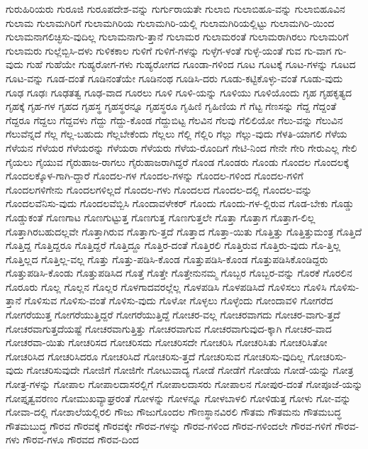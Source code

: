 {ಗುರುಹಿರಿಯರು
ಗುರೂಜಿ
ಗುರೂಪದೇಶ-ವನ್ನು
ಗುರ್ಗುರಾಯತೇ
ಗುಲಾಬಿ
ಗುಲಾಬಿಹೂ-ವನ್ನು
ಗುಲಾಬಿಹೂವಿನ
ಗುಲಾಮ
ಗುಲಾಮಗಿರಿಗೆ
ಗುಲಾಮಗಿರಿಯ
ಗುಲಾಮಗಿರಿ-ಯಲ್ಲಿ
ಗುಲಾಮಗಿರಿಯಲ್ಲಿಟ್ಟು
ಗುಲಾಮಗಿರಿ-ಯಿಂದ
ಗುಲಾಮನಾಗಲಿಚ್ಛಿಸು-ವುದಿಲ್ಲ
ಗುಲಾಮನಾಗು-ತ್ತಾನೆ
ಗುಲಾಮರ
ಗುಲಾಮರಂತೆ
ಗುಲಾಮರಾಗಿರಲು
ಗುಲಾಮರಿಗೆ
ಗುಲಾಮರು
ಗುಲ್ಲೆಬ್ಬಿಸಿ-ದಳು
ಗುಳಿಕಕಾಲ
ಗುಳಿಗೆ
ಗುಳಿಗೆ-ಗಳನ್ನು
ಗುಳ್ಳೆಗ-ಳಂತೆ
ಗುಳ್ಳೆ-ಯಂತೆ
ಗುವ
ಗು-ವಾಗ
ಗು-ವುದು
ಗುಹೆ
ಗುಹೆಯೇ
ಗುಹ್ಯರೋಗ-ಗಳು
ಗುಹ್ಯರೋಗದ
ಗೂಂಡಾ-ಗಳಿಂದ
ಗೂಟ
ಗೂಟಕ್ಕೆ
ಗೂಟ-ಗಳನ್ನು
ಗೂಟದ
ಗೂಟ-ವನ್ನು
ಗೂಡ-ದಂತೆ
ಗೂಡಿನಂತೆಯೇ
ಗೂಡಿನಂಥ
ಗೂಡಿಸಿ-ದರು
ಗೂಡು-ಕಟ್ಟಿಕೊಳ್ಳು-ವಂತೆ
ಗೂಡು-ವುದು
ಗೂಢ
ಗೂಢಃ
ಗೂಢತತ್ವ
ಗೂಢ-ವಾದ
ಗೂರಲು
ಗೂಳಿ
ಗೂಳಿ-ಯನ್ನು
ಗೂಳಿಯು
ಗೂಳಿಯೊಂದು
ಗೃಹ
ಗೃಹಕೃತ್ಯದ
ಗೃಹಕ್ಕೆ
ಗೃಹ-ಗಳ
ಗೃಹದ
ಗೃಹಸ್ಥ
ಗೃಹಸ್ಥರನ್ನೂ
ಗೃಹಸ್ಥರೂ
ಗೃಹಿಣಿ
ಗೃಹಿಣಿಯ
ಗೆ
ಗೆಟ್ಟ
ಗೆಣಸನ್ನು
ಗೆದ್ದ
ಗೆದ್ದಂತೆ
ಗೆದ್ದರೂ
ಗೆದ್ದಲು
ಗೆದ್ದವಳು
ಗೆದ್ದು
ಗೆದ್ದು-ಕೊಂಡ
ಗೆದ್ದುಬಿಟ್ಟ
ಗೆಲವಿನ
ಗೆಲವು
ಗೆಲಿಲಿಯೋ
ಗೆಲು-ವನ್ನು
ಗೆಲುವಿನ
ಗೆಲುವೆನ್ನದೆ
ಗೆಲ್ಲ
ಗೆಲ್ಲ-ಬಹುದು
ಗೆಲ್ಲಬೇಕೆಂದು
ಗೆಲ್ಲಲು
ಗೆಲ್ಲಿ
ಗೆಲ್ಲಿರಿ
ಗೆಲ್ಲು
ಗೆಲ್ಲು-ವುದು
ಗೆಳತಿ-ಯಾಗಲಿ
ಗೆಳೆಯ
ಗೆಳೆಯನ
ಗೆಳೆಯರ
ಗೆಳೆಯರನ್ನು
ಗೆಳೆಯರಾ
ಗೆಳೆಯರು
ಗೆಳೆಯ-ರೊಂದಿಗೆ
ಗೇಟಿ-ನಿಂದ
ಗೇನೇ
ಗೇರಿ
ಗೇರುಎಲ್ಲ
ಗೇಲಿ
ಗೈಯಲು
ಗೈಯುವ
ಗೈರುಹಾಜ-ರಾಗಲು
ಗೈರುಹಾಜರಾಗಿದ್ದರೆ
ಗೊಂಡ
ಗೊಂಡರು
ಗೊಂಡು
ಗೊಂದಲ
ಗೊಂದಲಕ್ಕೆ
ಗೊಂದಲಕ್ಕೊಳ-ಗಾಗಿ-ದ್ದಾರೆ
ಗೊಂದಲ-ಗಳ
ಗೊಂದಲ-ಗಳನ್ನು
ಗೊಂದಲ-ಗಳಿಂದ
ಗೊಂದಲ-ಗಳಿಗೆ
ಗೊಂದಲಗಳಿಗೇನು
ಗೊಂದಲಗಳಿಲ್ಲದೆ
ಗೊಂದಲ-ಗಳು
ಗೊಂದಲದ
ಗೊಂದಲ-ದಲ್ಲಿ
ಗೊಂದಲ-ವನ್ನು
ಗೊಂದಲವೆನಿಸು-ವುದು
ಗೊಂದಲವೆಬ್ಬಿಸಿ
ಗೊಂದಾವಳೇಕರ್
ಗೊಂದು
ಗೊಂದು-ಗಳ-ಲ್ಲಿರುವ
ಗೊಡ-ಬೇಕು
ಗೊಡ್ಡು
ಗೊಡ್ಡುಕಂತೆ
ಗೊಣಗಾಟ
ಗೊಣಗುಟ್ಟುತ್ತ
ಗೊಣಗುತ್ತ
ಗೊಣಗುತ್ತಲೇ
ಗೊತ್ತಾ
ಗೊತ್ತಾಗ
ಗೊತ್ತಾಗ-ಲಿಲ್ಲ
ಗೊತ್ತಾಗಿರಬಹುದಲ್ಲವೇ
ಗೊತ್ತಾಗಿರುವ
ಗೊತ್ತಾಗು-ತ್ತದೆ
ಗೊತ್ತಾದ
ಗೊತ್ತಾ-ಯಿತು
ಗೊತ್ತಿತ್ತು
ಗೊತ್ತಿತ್ತುಮಂತ್ರ
ಗೊತ್ತಿದೆ
ಗೊತ್ತಿದ್ದ
ಗೊತ್ತಿದ್ದರೂ
ಗೊತ್ತಿದ್ದರೆ
ಗೊತ್ತಿದ್ದೂ
ಗೊತ್ತಿರ-ದಂತೆ
ಗೊತ್ತಿರಲಿ
ಗೊತ್ತಿರುವ
ಗೊತ್ತಿರು-ವುದು
ಗೊ-ತ್ತಿಲ್ಲ
ಗೊತ್ತಿಲ್ಲದ
ಗೊತ್ತಿಲ್ಲ-ವಲ್ಲ
ಗೊತ್ತು
ಗೊತ್ತು-ಪಡಿಸಿ-ಕೊಂಡ
ಗೊತ್ತುಪಡಿಸಿ-ಕೊಂಡ
ಗೊತ್ತುಪಡಿಸಿಕೊಂಡಿದ್ದರು
ಗೊತ್ತುಪಡಿಸಿ-ಕೊಂಡು
ಗೊತ್ತುಪಡಿಸಿದ
ಗೊತ್ತೆ
ಗೊತ್ತೇ
ಗೊತ್ತೇನುನಮ್ಮ
ಗೊಬ್ಬರ
ಗೊಬ್ಬರ-ವನ್ನು
ಗೊರಕೆ
ಗೊರಲಿನ
ಗೊರೂರು
ಗೊಲ್ಲ
ಗೊಲ್ಲನ
ಗೊಲ್ಲರ
ಗೊಳಗಾದವರಲ್ಲೆಲ್ಲ
ಗೊಳಪಡಿಸಿ
ಗೊಳಪಡಿಸಿದೆ
ಗೊಳಿಸಲು
ಗೊಳಿಸಿ
ಗೊಳಿಸು-ತ್ತಾನೆ
ಗೊಳಿಸುವ
ಗೊಳಿಸು-ವಂತೆ
ಗೊಳಿಸು-ವುದು
ಗೊಳೋ
ಗೊಳ್ಳಲು
ಗೊಳ್ಳೆಂದು
ಗೋಂದಾವಳಿ
ಗೋಗರೆದ
ಗೋಗರೆಯುತ್ತ
ಗೋಗರೆಯುತ್ತಿದ್ದರೆ
ಗೋಗರೆಯುತ್ತಿದ್ದೆ
ಗೋಚರ-ವಲ್ಲ
ಗೋಚರವಾಗದು
ಗೋಚರ-ವಾಗು-ತ್ತದೆ
ಗೋಚರವಾಗುತ್ತದೆಯಷ್ಟೆ
ಗೋಚರವಾಗುತ್ತಿತ್ತು
ಗೋಚರವಾಗುವ
ಗೋಚರವಾಗುವುದ-ಕ್ಕಾಗಿ
ಗೋಚರ-ವಾದ
ಗೋಚರವಾ-ಯಿತು
ಗೋಚರಿಸದ
ಗೋಚರಿಸದು
ಗೋಚರಿಸದೇ
ಗೋಚರಿಸಿ
ಗೋಚರಿಸಿತು
ಗೋಚರಿಸಿತೋ
ಗೋಚರಿಸಿದ
ಗೋಚರಿಸಿದರೂ
ಗೋಚರಿಸಿದೆ
ಗೋಚರಿಸು-ತ್ತದೆ
ಗೋಚರಿಸುವ
ಗೋಚರಿಸು-ವುದಿಲ್ಲ
ಗೋಚರಿಸು-ವುದು
ಗೋಚರಿಸುವುದೇ
ಗೋಜಿಗೆ
ಗೋಜಿಗೇ
ಗೋಟುವಾದ್ಯ
ಗೋಡೆ
ಗೋಡೆಗೆ
ಗೋಡೆಯ
ಗೋಡೆ-ಯನ್ನು
ಗೋತ್ರ
ಗೋತ್ರ-ಗಳನ್ನು
ಗೋಪಾಲ
ಗೋಪಾಲದಾಸರಲ್ಲಿಗೆ
ಗೋಪಾಲದಾಸರು
ಗೋಪಾಲನ
ಗೋಪುರ-ದಂತೆ
ಗೋಪೂಜೆ-ಯನ್ನು
ಗೋಪ್ತೃತ್ವವರಣಂ
ಗೋಮುಖವ್ಯಾಘ್ರರಂತೆ
ಗೋಳನ್ನು
ಗೋಳನ್ನೂ
ಗೋಳಬಾಳಲಿ
ಗೋಳಿಡುತ್ತ
ಗೋಳು
ಗೋ-ವನ್ನು
ಗೋವಾ-ದಲ್ಲಿ
ಗೋಶಾಲೆಯಲ್ಲಿರಲಿ
ಗೌಜು
ಗೌಜುಗೊಂದಲ
ಗೌಣಸ್ಥಾನವಿರಲಿ
ಗೌತಮ
ಗೌತಮನು
ಗೌತಮಬದ್ಧ
ಗೌತಮಬುದ್ಧ
ಗೌರವ
ಗೌರವಕ್ಕೆ
ಗೌರವಕ್ಕೇ
ಗೌರವ-ಗಳನ್ನು
ಗೌರವ-ಗಳಿಂದ
ಗೌರವ-ಗಳಿಂದಲೇ
ಗೌರವ-ಗಳಿಗೆ
ಗೌರವ-ಗಳು
ಗೌರವ-ಗಳೂ
ಗೌರವದ
ಗೌರವ-ದಿಂದ
}
